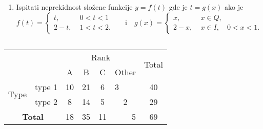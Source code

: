 \documentclass[a4, 11pt, leqno]{article}
\begin{document}
\begin{enumerate}
    \item Ispitati neprekidnost slo\v zene funkcije $y=f(t)$ gde je $t=g(x)$ ako je \[f(t)=\left\{
       \begin{array}{ll}
       t, & \; 0<t< 1\;\; \\
       2-t, & \; 1<t<2.\;
       \end{array}\right.\quad\mbox{ i} \quad g(x)=\left\{
       \begin{array}{ll}
            x,   &\; x\in Q ,\;\; \\
            2-x, & \; x\in I, \quad 0<x<1.\;
       \end{array}\right.\]

  \end{enumerate}
\begin{center}
$ $\\ $ $\\
    \begin{tabular}{|c|c|ccccc|}
        \hline
        \multicolumn{2}{|c|}{\multirow{2}{*}{}}             & \multicolumn{4}{c|}{Rank}                  & \multirow{2}{*}{Total} \\ \cline{3-6}
        \multicolumn{2}{|c|}{}                              & A  & B  & C  & \multicolumn{1}{c|}{Other} &                        \\ \hline
        \multirow{2}{*}{Type} & type 1                      & 10 & 21 & 6  & \multicolumn{1}{l}{3}                          & 40                     \\ \cline{2-7}
                              & type 2                      & 8  & 14 & 5  & 2                          & 29                     \\ \hline
        \multicolumn{2}{|c|}{\textbf{Total}}                & 18 & 35 & 11 & \multicolumn{1}{r}{5}                          & 69                     \\ \hline
    \end{tabular}
\end{center}
\end{document}
